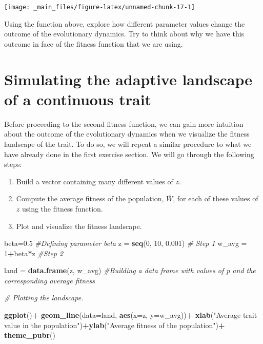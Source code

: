 \documentclass[
]{book}
\newenvironment{Shaded}{\begin{snugshade}}{\end{snugshade}}
\newcommand{\AttributeTok}[1]{\textcolor[rgb]{0.13,0.29,0.53}{#1}}
\newcommand{\CommentTok}[1]{\textcolor[rgb]{0.56,0.35,0.01}{\textit{#1}}}
\newcommand{\DecValTok}[1]{\textcolor[rgb]{0.00,0.00,0.81}{#1}}
\newcommand{\FloatTok}[1]{\textcolor[rgb]{0.00,0.00,0.81}{#1}}
\newcommand{\FunctionTok}[1]{\textcolor[rgb]{0.13,0.29,0.53}{\textbf{#1}}}
\newcommand{\NormalTok}[1]{#1}
\newcommand{\OtherTok}[1]{\textcolor[rgb]{0.56,0.35,0.01}{#1}}
\newcommand{\SpecialCharTok}[1]{\textcolor[rgb]{0.81,0.36,0.00}{\textbf{#1}}}
\newcommand{\StringTok}[1]{\textcolor[rgb]{0.31,0.60,0.02}{#1}}
\begin{document}
\texttt{[image: \_main\_files/figure-latex/unnamed-chunk-17-1]}

Using the function above, explore how different parameter values change the outcome of the evolutionary dynamics. Try to think about why we have this outcome in face of the fitness function that we are using.

\hypertarget{simulating-the-adaptive-landscape-of-a-continuous-trait}{%
\section{Simulating the adaptive landscape of a continuous trait}\label{simulating-the-adaptive-landscape-of-a-continuous-trait}}

Before proceeding to the second fitness function, we can gain more intuition about the outcome of the evolutionary dynamics when we visualize the fitness landscape of the trait. To do so, we will repeat a similar procedure to what we have already done in the first exercise section. We will go through the following steps:

\begin{enumerate}
\def\labelenumi{\arabic{enumi}.}
\item
  Build a vector containing many different values of \(z\).
\item
  Compute the average fitness of the population, \(\overline{W}\), for each of these values of \(z\) using the fitness function.
\item
  Plot and visualize the fitness landscape.
\end{enumerate}

\begin{Shaded}
\begin{Highlighting}[]
\NormalTok{beta}\OtherTok{=}\FloatTok{0.5} \CommentTok{\#Defining parameter beta}
\NormalTok{z }\OtherTok{=} \FunctionTok{seq}\NormalTok{(}\DecValTok{0}\NormalTok{, }\DecValTok{10}\NormalTok{, }\FloatTok{0.001}\NormalTok{) }\CommentTok{\# Step 1}
\NormalTok{w\_avg }\OtherTok{=} \DecValTok{1}\SpecialCharTok{+}\NormalTok{beta}\SpecialCharTok{*}\NormalTok{z }\CommentTok{\#Step 2}

\NormalTok{land }\OtherTok{=} \FunctionTok{data.frame}\NormalTok{(z, w\_avg) }\CommentTok{\#Building a data frame with values of p and the corresponding average fitness}

\CommentTok{\# Plotting the landscape.}

\FunctionTok{ggplot}\NormalTok{()}\SpecialCharTok{+}
  \FunctionTok{geom\_line}\NormalTok{(}\AttributeTok{data=}\NormalTok{land, }\FunctionTok{aes}\NormalTok{(}\AttributeTok{x=}\NormalTok{z, }\AttributeTok{y=}\NormalTok{w\_avg))}\SpecialCharTok{+}
  \FunctionTok{xlab}\NormalTok{(}\StringTok{"Average trait value in the population"}\NormalTok{)}\SpecialCharTok{+}\FunctionTok{ylab}\NormalTok{(}\StringTok{"Average fitness of the population"}\NormalTok{)}\SpecialCharTok{+}
  \FunctionTok{theme\_pubr}\NormalTok{()}
\end{Highlighting}
\end{Shaded}
\end{document}
